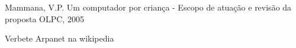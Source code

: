 \documentclass[
12pt,		%
openright,	%
twoside,  %
a4paper,			%
chapter=TITLE,		%
english,			%
french,				%
spanish,			%
brazil				%
]{USPSC-classe/USPSC}
\begin{document}
\begin{flushleft}
\begin{flushleft}
\begin{flushleft}
\begin{flushleft}
\begin{flushleft}
\begin{flushleft}
\begin{flushleft}
\begin{flushleft}
\begin{flushleft}
\begin{flushleft}
[MAMMANA, 2005a] Mammana, V.P. Um computador por crian\c{c}a - Escopo de atua\c{c}\~ao e revis\~ao da proposta OLPC, 2005
\end{flushleft}


\end{flushleft}


\end{flushleft}


\end{flushleft}


\end{flushleft}


\end{flushleft}


\end{flushleft}


\end{flushleft}


\end{flushleft}


\end{flushleft}


\begin{flushleft}
\begin{flushleft}
\begin{flushleft}
\begin{flushleft}
\begin{flushleft}
\begin{flushleft}
\begin{flushleft}
\begin{flushleft}
\begin{flushleft}
\begin{flushleft}
[ARPANET, 2022] Verbete Arpanet na wikipedia
\end{flushleft}


\end{flushleft}


\end{flushleft}


\end{flushleft}


\end{flushleft}


\end{flushleft}


\end{flushleft}


\end{flushleft}


\end{flushleft}


\end{flushleft}
\end{document}
